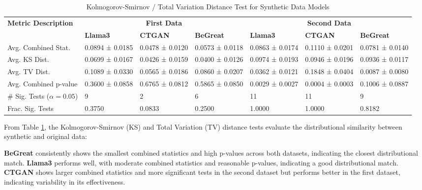 \begin{table}[H]
\centering
\caption{Kolmogorov-Smirnov / Total Variation Distance Test for Synthetic Data Models}
\label{tab:ks_tv_test_combined}
\begin{tabularx}{\textwidth}{l*{6}{X}}
    \toprule
    \textbf{Metric Description} & \multicolumn{3}{c}{\textbf{First Data}} & \multicolumn{3}{c}{\textbf{Second Data}} \\
    \cmidrule(lr){2-4} \cmidrule(lr){5-7}
    & \textbf{Llama3} & \textbf{CTGAN} & \textbf{BeGreat} & \textbf{Llama3} & \textbf{CTGAN} & \textbf{BeGreat} \\
    \midrule
    Avg. Combined Stat. & 0.0894 ± 0.0185 & 0.0478 ± 0.0120 & 0.0573 ± 0.0118 & 0.0863 ± 0.0174 & 0.1110 ± 0.0201 & 0.0781 ± 0.0140 \\
    Avg. KS Dist. & 0.0699 ± 0.0167 & 0.0426 ± 0.0159 & 0.0400 ± 0.0126 & 0.0974 ± 0.0193 & 0.0946 ± 0.0196 & 0.0936 ± 0.0117 \\
    Avg. TV Dist. & 0.1089 ± 0.0330 & 0.0565 ± 0.0186 & 0.0860 ± 0.0207 & 0.0362 ± 0.0121 & 0.1848 ± 0.0404 & 0.0087 ± 0.0080 \\
    Avg. Combined p-value & 0.3600 ± 0.0858 & 0.6765 ± 0.0812 & 0.5865 ± 0.0850 & 0.0029 ± 0.0027 & 0.0004 ± 0.0003 & 0.1006 ± 0.0887 \\
    \# Sig. Tests (\(\alpha=0.05\)) & 9 & 2 & 6 & 11 & 11 & 9 \\
    Frac. Sig. Tests & 0.3750 & 0.0833 & 0.2500 & 1.0000 & 1.0000 & 0.8182 \\
    \bottomrule
\end{tabularx}
\end{table}



From Table \ref{tab:ks_tv_test_combined}, the Kolmogorov-Smirnov (KS) and Total Variation (TV) distance tests evaluate the distributional similarity between synthetic and original data:

\textbf{BeGreat} consistently shows the smallest combined statistics and high p-values across both datasets, indicating the closest distributional match.
\textbf{Llama3} performs well, with moderate combined statistics and reasonable p-values, indicating a good distributional match.
\textbf{CTGAN} shows larger combined statistics and more significant tests in the second dataset but performs better in the first dataset, indicating variability in its effectiveness.

\vspace{0.5cm}

